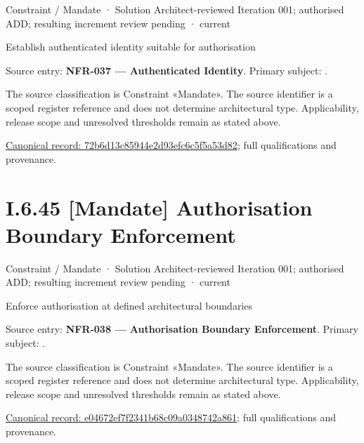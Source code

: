 \label{element:72b6d13c85944e2d93efc6c5f5a53d82}
{\small Constraint / Mandate · Solution Architect-reviewed Iteration 001; authorised ADD; resulting increment review pending · current}\par

Establish authenticated identity suitable for authorisation



Source entry: \textbf{NFR-037 — Authenticated Identity}. Primary subject: \texttt{}.



The source classification is Constraint «Mandate». The source identifier is a scoped register reference and does not determine architectural type. Applicability, release scope and unresolved thresholds remain as stated above.


{\footnotesize \href{../../../../../../../../continuum/motivation/constraint/mandate/72b6d13c85944e2d93efc6c5f5a53d82.md}{Canonical record: 72b6d13c85944e2d93efc6c5f5a53d82}; full qualifications and provenance.}\par
\section*{I.6.45 [Mandate] Authorisation Boundary Enforcement}
\label{navigation:I.6.45}

\label{element:e04672ef7f2341b68c09a0348742a861}
{\small Constraint / Mandate · Solution Architect-reviewed Iteration 001; authorised ADD; resulting increment review pending · current}\par

Enforce authorisation at defined architectural boundaries



Source entry: \textbf{NFR-038 — Authorisation Boundary Enforcement}. Primary subject: \texttt{}.



The source classification is Constraint «Mandate». The source identifier is a scoped register reference and does not determine architectural type. Applicability, release scope and unresolved thresholds remain as stated above.


{\footnotesize \href{../../../../../../../../continuum/motivation/constraint/mandate/e04672ef7f2341b68c09a0348742a861.md}{Canonical record: e04672ef7f2341b68c09a0348742a861}; full qualifications and provenance.}\par
